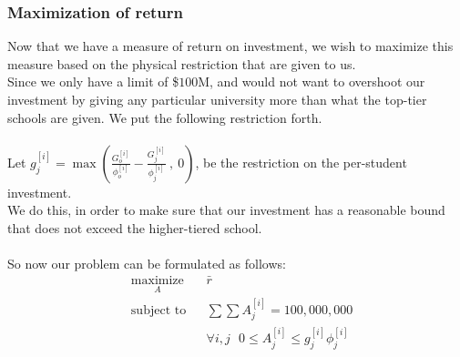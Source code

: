 \documentclass[12pt]{scrartcl}
\begin{document}
	\subsubsection{Maximization of return}
		Now that we have a measure of return on investment, we wish to maximize this measure based on the physical restriction that are given to us.\\
		Since we only have a limit of \$$100$M, and would not want to overshoot our investment by giving any particular university more than what the top-tier schools are given. We put the following restriction forth.\\
		\\
		Let $g_j^{[i]} = \max( \frac{  G_o^{[i]}  }{  \phi_o^{[i]} } - \frac{  G_j^{[i]}  }{  \phi_j^{[i]} } \ ,\ 0 )$, be the restriction on the per-student investment.\\ 
		We do this, in order to make sure that our investment has a reasonable bound that does not exceed the higher-tiered school.\\
		\\
		So now our problem can be formulated as follows:
		\begin{equation*}
				\begin{aligned}
					& \underset{A}{\text{maximize}}
					& &\bar{r}\\
					& \text{subject to}
					& & \sum \sum A_j^{[i]} = 100,000,000 \\
					&&& \forall i,j \ \ \ 0\le A_j^{[i]} \le g_j^{[i]}\phi_j^{[i]}
				\end{aligned}
		\end{equation*}
\end{document}
